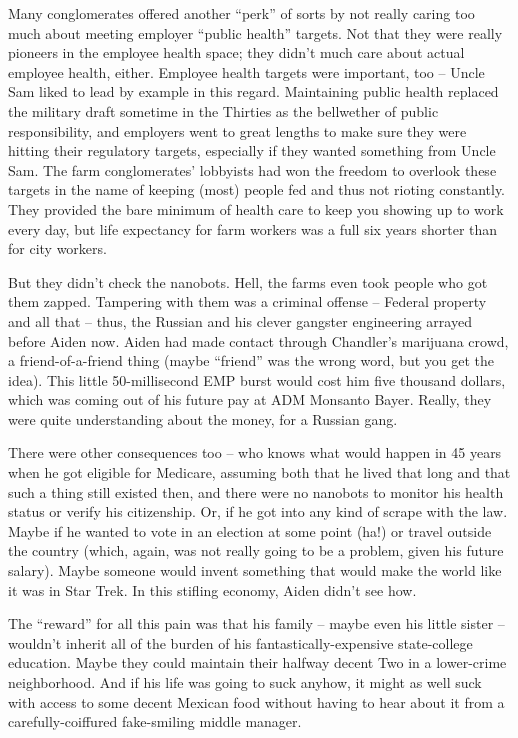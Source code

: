 \documentclass[11pt]{book}
\begin{document}
	Many conglomerates offered another ``perk'' of sorts by not really caring too much about meeting employer ``public health'' targets. Not that they were really pioneers in the employee health space; they didn't much care about actual employee health, either. Employee health targets were important, too -- Uncle Sam liked to lead by example in this regard. Maintaining public health replaced the military draft sometime in the Thirties as the bellwether of public responsibility, and employers went to great lengths to make sure they were hitting their regulatory targets, especially if they wanted something from Uncle Sam. The farm conglomerates' lobbyists had won the freedom to overlook these targets in the name of keeping (most) people fed and thus not rioting constantly. They provided the bare minimum of health care to keep you showing up to work every day, but life expectancy for farm workers was a full six years shorter than for city workers. 
	
	But they didn't check the nanobots. Hell, the farms even took people who got them zapped. Tampering with them was a criminal offense -- Federal property and all that -- thus, the Russian and his clever gangster engineering arrayed before Aiden now. Aiden had made contact through Chandler's marijuana crowd, a friend-of-a-friend thing (maybe ``friend'' was the wrong word, but you get the idea). This little 50-millisecond EMP burst would cost him five thousand dollars, which was coming out of his future pay at ADM Monsanto Bayer. Really, they were quite understanding about the money, for a Russian gang. 
	
	There were other consequences too -- who knows what would happen in 45 years when he got eligible for Medicare, assuming both that he lived that long and that such a thing still existed then, and there were no nanobots to monitor his health status or verify his citizenship. Or, if he got into any kind of scrape with the law. Maybe if he wanted to vote in an election at some point (ha!) or travel outside the country (which, again, was not really going to be a problem, given his future salary). Maybe someone would invent something that would make the world like it was in Star Trek. In this stifling economy, Aiden didn't see how. 
	
	The ``reward'' for all this pain was that his family -- maybe even his little sister -- wouldn't inherit all of the burden of his fantastically-expensive state-college education. Maybe they could maintain their halfway decent Two in a lower-crime neighborhood. And if his life was going to suck anyhow, it might as well suck with access to some decent Mexican food without having to hear about it from a carefully-coiffured fake-smiling middle manager.
	
\end{document}
